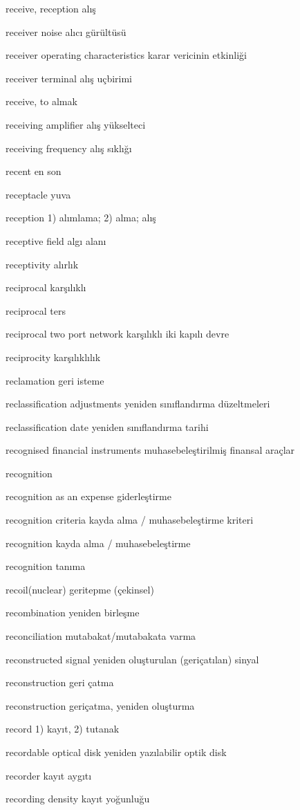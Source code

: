 \documentclass[12pt,fleqn]{article}\usepackage{../../common}
\begin{document}
receive, reception alış

receiver noise alıcı gürültüsü

receiver operating characteristics karar vericinin etkinliği

receiver terminal alış uçbirimi

receive, to almak

receiving amplifier alış yükselteci

receiving frequency alış sıklığı

recent en son

receptacle yuva

reception 1) alımlama; 2) alma; alış

receptive field algı alanı

receptivity alırlık

reciprocal karşılıklı

reciprocal ters

reciprocal two port network karşılıklı iki kapılı devre

reciprocity karşılıklılık

reclamation geri isteme

reclassification adjustments yeniden sınıflandırma düzeltmeleri

reclassification date yeniden sınıflandırma tarihi

recognised financial instruments muhasebeleştirilmiş finansal araçlar

recognition

recognition as an expense giderleştirme

recognition criteria kayda alma / muhasebeleştirme kriteri

recognition kayda alma / muhasebeleştirme

recognition tanıma

recoil(nuclear) geritepme (çekinsel)

recombination yeniden birleşme

reconciliation mutabakat/mutabakata varma

reconstructed signal yeniden oluşturulan (geriçatılan) sinyal

reconstruction geri çatma

reconstruction geriçatma, yeniden oluşturma

record 1) kayıt, 2) tutanak

recordable optical disk yeniden yazılabilir optik disk

recorder kayıt aygıtı

recording density kayıt yoğunluğu
\end{document}

